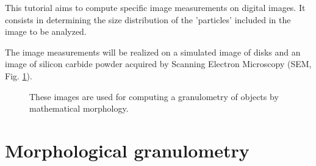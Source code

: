 \def\difficulty{1}

\begin{note}This tutorial aims to compute specific image measurements on digital images. It consists in determining the size distribution of the 'particles' included in the image to be analyzed.
\end{note}

\noindent The image measurements will be realized on a simulated image of disks and an image of silicon carbide powder acquired by Scanning Electron Microscopy (SEM, Fig. \ref{fig:granulometry:enonce:images}).
\begin{figure}[h]
\centering\caption{These images are used for computing a granulometry of objects by mathematical morphology.}%
\hspace{1cm}
%
\label{fig:granulometry:enonce:images}%
\end{figure}

\section{Morphological granulometry}
